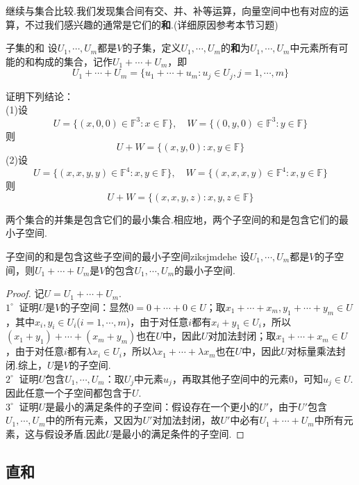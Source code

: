 \documentclass[lang=cn, zihao=5]{elegantbook}
\newcommand{\F}{\mathbb{F}}
\newcommand{\buzhou}[1]{$#1^{\circ} \ $}
\begin{document}
继续与集合比较.我们发现集合间有交、并、补等运算，向量空间中也有对应的运算，不过我们感兴趣的通常是它们的\textbf{和}.(详细原因参考本节习题)

\begin{definition}{子集的和}
    设$U_1,\cdots ,U_m$都是$V$的子集，定义$U_1, \cdots ,U_m$的\textbf{和}为$U_1, \cdots ,U_m$中元素所有可能的和构成的集合，记作$U_1+ \cdots +U_m$，即$$U_1+ \cdots +U_m = \{ u_1+ \cdots +u_m : u_j \in U_j,j=1, \cdots ,m \}$$
\end{definition}

\begin{example}
    证明下列结论： \\
    (1)设$$U = \{ (x,0,0) \in \F ^{3} : x \in \F \} , \quad W = \{ (0,y,0) \in \F ^{3} : y \in \F \}$$
    则$$U+W = \{ (x,y,0) : x,y \in \F \}$$
    (2)设$$U = \{ (x,x,y,y) \in \F ^{4} : x,y \in \F \} , \quad W = \{ (x,x,x,y) \in \F ^{4} : x,y \in \F \}$$
    则$$U+W = \{ (x,x,y,z) : x,y,z \in \F \}$$
\end{example}

两个集合的并集是包含它们的最小集合.相应地，两个子空间的和是包含它们的最小子空间.

\begin{proposition}{子空间的和是包含这些子空间的最小子空间}{ziksjmdehe}
    设$U_1,\cdots ,U_m$都是$V$的子空间，则$U_1+\cdots +U_m$是$V$的包含$U_1,\cdots ,U_m$的最小子空间.
\end{proposition}
\begin{proof}
    记$U=U_1+\cdots +U_m$. \\
    \buzhou{1} 证明$U$是$V$的子空间：显然$0=0 + \cdots + 0 \in U$；取$x_1+ \cdots +x_m,y_1+ \cdots +y_m \in U$，其中$x_i,y_i \in U_i$($i=1,\cdots ,m$)，由于对任意$i$都有$x_i+y_1 \in U_i$，所以$(x_1+y_1) + \cdots + (x_m+y_m)$也在$U$中，因此$U$对加法封闭；取$x_1+ \cdots +x_m \in U$，由于对任意$i$都有$\lambda x_i \in U_i$，所以$\lambda x_1 + \cdots + \lambda x_m$也在$U$中，因此$U$对标量乘法封闭.综上，$U$是$V$的子空间.\\
    \buzhou{2} 证明$U$包含$U_1,\cdots ,U_m$：取$U_j$中元素$u_j$，再取其他子空间中的元素$0$，可知$u_j \in U$.因此任意一个子空间都包含于$U$. \\
    \buzhou{3} 证明$U$是最小的满足条件的子空间：假设存在一个更小的$U'$，由于$U'$包含$U_1, \cdots ,U_m$中的所有元素，又因为$U'$对加法封闭，故$U'$中必有$U_1+ \cdots +U_m$中所有元素，这与假设矛盾.因此$U$是最小的满足条件的子空间.
\end{proof}

\subsection{直和}
\end{document}
